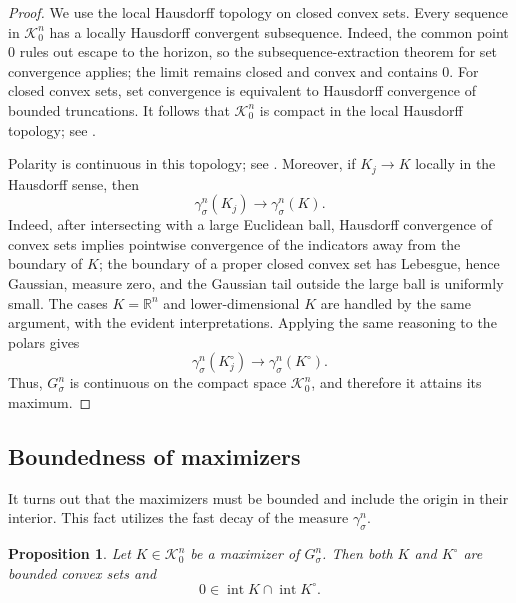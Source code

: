 \documentclass[12pt,oneside,reqno]{amsart}
\numberwithin{equation}{section}
\newtheorem{proposition}[theorem]{Proposition}
\theoremstyle{remark}
\newcommand{\R}{\mathbb R}
\def\class{\mathcal{K}^n_0}
\begin{document}
\begin{proof}
We use the local Hausdorff topology on closed convex sets.
Every sequence in $\class$ has a locally Hausdorff convergent
subsequence. Indeed, the common point $0$ rules out escape to the
horizon, so the subsequence-extraction theorem for set convergence
applies; the limit remains closed and convex and contains $0$.
For closed convex sets, set convergence is equivalent to Hausdorff
convergence of bounded truncations. It follows
that $\class$ is compact in the local Hausdorff topology; see
\cite[Chapter 4]{RockafellarWets}. %

Polarity is continuous in this topology; see
\cite[Theorem~7.2]{Wijsman1966}.
Moreover, if $K_j\to K$ locally in the Hausdorff sense, then
\[
        \gamma_\sigma^n(K_j)\to\gamma_\sigma^n(K).
\]
Indeed, after intersecting with a large Euclidean ball, Hausdorff convergence of convex sets implies pointwise convergence of the indicators away from the boundary of $K$; the boundary of a proper closed convex set has Lebesgue, hence Gaussian, measure zero, and the Gaussian tail outside the large ball is uniformly small. The cases $K=\R^n$ and lower-dimensional $K$ are handled by the same argument, with the evident interpretations. Applying the same reasoning to the polars gives
\[
        \gamma_\sigma^n(K_j^\circ)\to\gamma_\sigma^n(K^\circ).
\]
Thus, $G^n_\sigma$ is continuous on the compact space $\class$, and therefore it attains its maximum.
\end{proof}




\subsection{Boundedness of maximizers}\label{sec:bddness}

It turns out that the maximizers must be bounded and include the origin in their interior. This fact  utilizes the fast decay of the measure  $\gamma_\sigma^n$.  

\begin{proposition}\label{lem:maximizer-is-body}
Let $K\in\class$ be a maximizer of $G^n_\sigma$.  Then both $K$ and
$K^\circ$ are bounded convex sets and
\[
 0\in\operatorname{int}K\cap\operatorname{int}K^\circ.
\]
\end{proposition}
\end{document}
